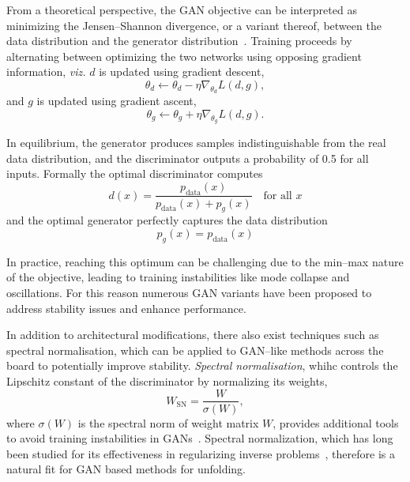         From a theoretical perspective, the GAN objective can be interpreted as minimizing the Jensen--Shannon divergence, or a variant thereof, between the data distribution and the generator distribution~\cite{lin_divergence_1991, nielsen_jensenshannon_2019, manning_foundations_1999, endres_new_2003, Altheimer2012JetBenchmarks, fuglede_jensen-shannon_2004}.
        Training proceeds by alternating between optimizing the two networks using opposing gradient information, \textit{viz.} \(d\) is updated using gradient descent,
        \begin{equation}
            \theta_d \leftarrow \theta_d - \eta \nabla_{\theta_d} L(d, g),
        \end{equation}
        and \(g\) is updated using gradient ascent,
        \begin{equation}
            \theta_g \leftarrow \theta_g + \eta \nabla_{\theta_g} L(d, g).
        \end{equation}
        
        In equilibrium, the generator produces samples indistinguishable from the real data distribution, and the discriminator outputs a probability of 0.5 for all inputs.
        Formally the optimal discriminator computes
        \begin{equation}
            d(x) = \frac{p_{\text{data}}(x)}{p_{\text{data}}(x) + p_g(x)}\quad\text{for all } x
        \end{equation}
        and the optimal generator perfectly captures the data distribution
        \begin{equation}
            p_g(x) = p_{\text{data}}(x)
        \end{equation}
        
        In practice, reaching this optimum can be challenging due to the min--max nature of the objective, leading to training instabilities like mode collapse and oscillations.
        For this reason numerous GAN variants have been proposed to address stability issues and enhance performance.
        
        In addition to architectural modifications, there also exist techniques such as spectral normalisation, which can be applied to GAN--like methods across the board to potentially improve stability.
        \emph{Spectral normalisation}, whihc controls the Lipschitz constant of the discriminator by normalizing its weights,
        \begin{equation}
            W_{\text{SN}} = \frac{W}{\sigma(W)},
        \end{equation}
        where \(\sigma(W)\) is the spectral norm of weight matrix \(W\), provides additional tools to avoid training instabilities in GANs~\cite{Terjek2019AdversarialRegularization, miyato_spectral_2018}.
        Spectral normalization, which has long been studied for its effectiveness in regularizing inverse problems~\cite{Clason2021RegularizationProblems, Engl2020RegularizationProblems, hansen_6_2006}, therefore is a natural fit for GAN based methods for unfolding.

